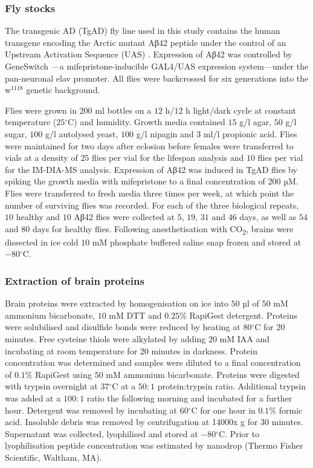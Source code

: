 \subsubsection{Fly stocks}

The transgenic AD (TgAD) fly line used in this study \cite{Sofola2010} contains the human transgene encoding the Arctic mutant Aβ42 peptide under the control of an Upstream Activation Sequence (UAS) \cite{Crowther2005}.
Expression of Aβ42 was controlled by GeneSwitch \cite{Osterwalder2001}---a mifepristone-inducible GAL4/UAS expression system---under the pan-neuronal elav promoter.
All flies were backcrossed for six generations into the w$^{1118}$ genetic background.

Flies were grown in $200$ ml bottles on a $12$ h/$12$ h light/dark cycle at constant temperature ($25$$^{\circ}$C) and humidity.
Growth media contained $15$ g/l agar, $50$ g/l sugar, $100$ g/l autolysed yeast, $100$ g/l nipagin and $3$ ml/l propionic acid.
Flies were maintained for two days after eclosion before females were transferred to vials at a density of $25$ flies per vial for the lifespan analysis and $10$ flies per vial for the IM-DIA-MS analysis.
Expression of Aβ42 was induced in TgAD flies by spiking the growth media with mifepristone to a final concentration of $200$ µM.
Flies were transferred to fresh media three times per week, at which point the number of surviving flies was recorded.
For each of the three biological repeats, $10$ healthy and $10$ Aβ42 flies were collected at $5$, $19$, $31$ and $46$ days, as well as $54$ and $80$ days for healthy flies.
Following anesthetisation with CO\textsubscript{2}, brains were dissected in ice cold $10$ mM phosphate buffered saline snap frozen and stored at $-80$$^{\circ}$C.

\subsubsection{Extraction of brain proteins}

Brain proteins were extracted by homogenisation on ice into $50$ µl of $50$ mM ammonium bicarbonate, $10$ mM DTT and $0.25\%$ RapiGest detergent.
Proteins were solubilised and disulfide bonds were reduced by heating at $80$$^{\circ}$C for $20$ minutes.
Free cysteine thiols were alkylated by adding $20$ mM IAA and incubating at room temperature for $20$ minutes in darkness.
Protein concentration was determined and samples were diluted to a final concentration of $0.1\%$ RapiGest using $50$ mM ammonium bicarbonate.
Proteins were digested with trypsin overnight at $37$$^{\circ}$C at a $50:1$ protein:trypsin ratio.
Additional trypsin was added at a $100:1$ ratio the following morning and incubated for a further hour.
Detergent was removed by incubating at $60$$^{\circ}$C for one hour in $0.1\%$ formic acid.
Insoluble debris was removed by centrifugation at \num{14000}x g for $30$ minutes.
Supernatant was collected, lyophilised and stored at $-80$$^{\circ}$C.
Prior to lyophilisation peptide concentration was estimated by nanodrop (Thermo Fisher Scientific, Waltham, MA).

